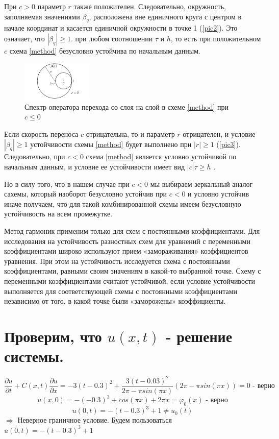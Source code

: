 \documentclass[12pt,a4paper]{scrartcl}
\begin{document}
	При $c > 0$ параметр $r$ также положителен. Следовательно, окружность, заполняемая значениями $\beta_q$, расположена вне единичного круга с центром в начале координат и касается единичной окружности в точке 1 (\eqref{pic2}). Это означает, что $| \beta_q| \ge 1$. при любом соотношении $\tau$ и $h$, то есть при положительном $c$ схема \eqref{method} безусловно устойчива по начальным данным.
	
	\begin{figure}[h]
		\centering
		\includegraphics[width=0.3\textwidth]{picture3.png}
		\caption{Спектр оператора перехода со слоя на слой в схеме \eqref{method} при $c \le 0$}
		\label{pic3}
	\end{figure}
	
	Если скорость переноса $c$ отрицательна, то и параметр $r$ отрицателен, и условие $| \beta_q| \ge 1$ устойчивости схемы \eqref{method} будет выполнено при $|r| \ge 1$ (\eqref{pic3}). Следовательно, при $c < 0$ схема \eqref{method} является условно устойчивой по начальным данным, и условие ее устойчивости имеет вид $|c|\tau \ge h$ . 
	
	Но в силу того, что в нашем случае при $c < 0$ мы выбираем зеркальный аналог сахемы, который наоборот безусловно устойчив при $c < 0$ и условно устойчив иначе получаем, что для такой комбинированной схемы имеем безусловную устойчивость на всем промежутке.
	
	Метод гармоник применим только для схем с постоянными коэффициентами. Для исследования на устойчивость разностных схем для уравнений с переменными коэффициентами широко используют прием «замораживания» коэффициентов уравнения. При этом на устойчивость исследуется схема с постоянными коэффициентами, равными своим значениям в какой-то выбранной точке. Схему с переменными коэффициентами считают устойчивой, если условие устойчивости выполняется для соответствующей схемы с постоянными коэффициентами независимо от того, в какой точке были «заморожены» коэффициенты.
	
	\section{Проверим, что $u(x,t)$ - решение системы.}
	\[
	\frac{\partial u}{\partial t}+C(x,t) \frac{\partial u}{\partial x}=-3(t-0.3)^2+\frac{3(t-0.03)^2}{2 \pi - \pi sin(\pi x)}(2 \pi - \pi sin(\pi x))=0 \text{ - верно}
	\]
	\[
	u(x,0) =-(-0.3)^3+cos(\pi x)+2 \pi x= \varphi_0(x) \text{ - верно}
	\]
	\[
	u(0,t) = -(t-0.3)^3+1 \ne u_0(t) 
	\]
	$\Rightarrow $ Неверное граничное условие. Будем пользоваться $ u(0,t) = -(t-0.3)^3+1$
	\newpage
\end{document}
